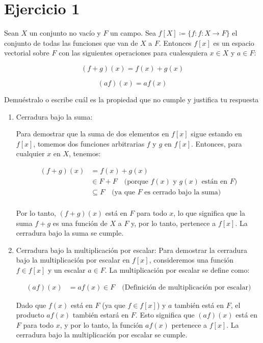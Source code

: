\section*{Ejercicio 1}

Sean $X$ un conjunto no vacío y $F$ un campo.
Sea $f[X] \coloneqq \{f : f \colon X\to F\}$ el conjunto de todas las funciones que van de $X$ a $F$. Entonces $f[x]$ es un espacio vectorial sobre $F$ con las siguientes operaciones para cualesquiera $x \in X$ y $a \in F$:

$$(f+g)(x) = f(x) + g(x)$$

$$(af)(x) = a f(x)$$


\noindent Demuéstralo o escribe cuál es la propiedad que no cumple y justifica tu respuesta
\begin{enumerate}
    \item Cerradura bajo la suma: 
    
    Para demostrar que la suma de dos elementos en $f[x]$ sigue estando en $f[x]$, tomemos dos funciones arbitrarias $f$ y $g$ en $f[x]$. Entonces, para cualquier $x$ en $X$, tenemos:
    
    \begin{align*}
        (f + g)(x) &= f(x) + g(x) \\
        &\in F + F \quad \text{(porque } f(x) \text{ y } g(x) \text{ están en } F\text{)} \\
        &\subseteq F \quad \text{(ya que } F \text{ es cerrado bajo la suma)} \\
    \end{align*}
    
    Por lo tanto, $(f + g)(x)$ está en $F$ para todo $x$, lo que significa que la suma $f + g$ es una función de $X$ a $F$ y, por lo tanto, pertenece a $f[x]$. La cerradura bajo la suma se cumple.

    \item Cerradura bajo la multiplicación por escalar: Para demostrar la cerradura bajo la multiplicación por escalar en $f[x]$, consideremos una función $f \in f[x]$ y un escalar $a \in F$. La multiplicación por escalar se define como:
    
    \begin{align*}
        (af)(x) &= a f(x) \in F \quad \text{(Definición de multiplicación por escalar)}
    \end{align*}
    
    Dado que $f(x)$ está en $F$ (ya que $f \in f[x]$) y $a$ también está en $F$, el producto $af(x)$ también estará en $F$. Esto significa que $(af)(x)$ está en $F$ para todo $x$, y por lo tanto, la función $af(x)$ pertenece a $f[x]$. La cerradura bajo la multiplicación por escalar se cumple.


\end{enumerate}
